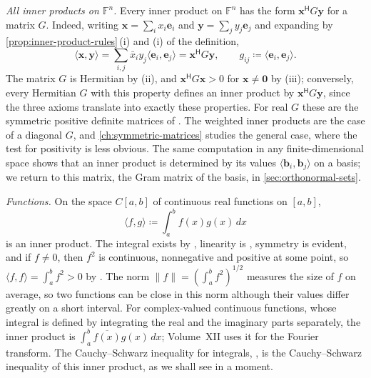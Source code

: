 \emph{All inner products on $\mathbb F^n$.} Every inner product on $\mathbb F^n$ has the form $\mathbf x^{\mathsf H}G\mathbf y$ for a matrix $G$. Indeed, writing $\mathbf x=\sum_ix_i\mathbf e_i$ and $\mathbf y=\sum_jy_j\mathbf e_j$ and expanding by \cref{prop:inner-product-rules}\,(i) and (i) of the definition,
\begin{equation}
\langle\mathbf x,\mathbf y\rangle=\sum_{i,j}\bar x_iy_j\langle\mathbf e_i,\mathbf e_j\rangle=\mathbf x^{\mathsf H}G\mathbf y,\qquad g_{ij}\coloneqq\langle\mathbf e_i,\mathbf e_j\rangle .
\label{eq:gram-form}
\end{equation}
The matrix $G$ is Hermitian by (ii), and $\mathbf x^{\mathsf H}G\mathbf x>0$ for $\mathbf x\ne\mathbf 0$ by (iii); conversely, every Hermitian $G$ with this property defines an inner product by $\mathbf x^{\mathsf H}G\mathbf y$, since the three axioms translate into exactly these properties. For real $G$ these are the symmetric positive definite matrices of . The weighted inner products are the case of a diagonal $G$, and \cref{ch:symmetric-matrices} studies the general case, where the test for positivity is less obvious. The same computation in any finite-dimensional space shows that an inner product is determined by its values $\langle\mathbf b_i,\mathbf b_j\rangle$ on a basis; we return to this matrix, the Gram matrix of the basis, in \cref{sec:orthonormal-sets}.

\emph{Functions.} On the space $C[a,b]$ of continuous real functions on $[a,b]$,
\[
\langle f,g\rangle\coloneqq\int_a^bf(x)g(x)\,dx
\]
is an inner product. The integral exists by , linearity is , symmetry is evident, and if $f\ne0$, then $f^2$ is continuous, nonnegative and positive at some point, so $\langle f,f\rangle=\int_a^bf^2>0$ by . The norm $\|f\|=(\int_a^bf^2)^{1/2}$ measures the size of $f$ on average, so two functions can be close in this norm although their values differ greatly on a short interval. For complex-valued continuous functions, whose integral is defined by integrating the real and the imaginary parts separately, the inner product is $\int_a^b\overline{f(x)}g(x)\,dx$; Volume~XII uses it for the Fourier transform. The Cauchy--Schwarz inequality for integrals, , is the Cauchy--Schwarz inequality of this inner product, as we shall see in a moment.

